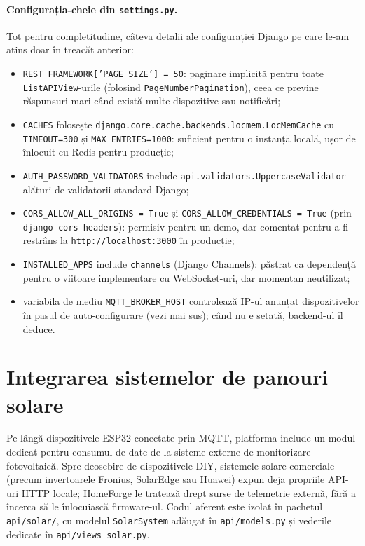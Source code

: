 \paragraph{Configurația-cheie din \texttt{settings.py}.} Tot pentru completitudine, câteva detalii ale configurației Django pe care le-am atins doar în treacăt anterior:
\begin{itemize}
    \item \texttt{REST\_FRAMEWORK['PAGE\_SIZE'] = 50}: paginare implicită pentru toate \texttt{ListAPIView}-urile (folosind \texttt{PageNumberPagination}), ceea ce previne răspunsuri mari când există multe dispozitive sau notificări;
    \item \texttt{CACHES} folosește \texttt{django.core.cache.backends.locmem.LocMemCache} cu \texttt{TIMEOUT=300} și \texttt{MAX\_ENTRIES=1000}: suficient pentru o instanță locală, ușor de înlocuit cu Redis pentru producție;
    \item \texttt{AUTH\_PASSWORD\_VALIDATORS} include \texttt{api.validators.UppercaseValidator} alături de validatorii standard Django;
    \item \texttt{CORS\_ALLOW\_ALL\_ORIGINS = True} și \texttt{CORS\_ALLOW\_CREDENTIALS = True} (prin \texttt{django-cors-headers}): permisiv pentru un demo, dar comentat pentru a fi restrâns la \texttt{http://localhost:3000} în producție;
    \item \texttt{INSTALLED\_APPS} include \texttt{channels} (Django Channels): păstrat ca dependență pentru o viitoare implementare cu WebSocket-uri, dar momentan neutilizat;
    \item variabila de mediu \texttt{MQTT\_BROKER\_HOST} controlează IP-ul anunțat dispozitivelor în pasul de auto-configurare (vezi mai sus); când nu e setată, backend-ul îl deduce.
\end{itemize}

\section{Integrarea sistemelor de panouri solare}
Pe lângă dispozitivele ESP32 conectate prin MQTT, platforma include un modul dedicat pentru consumul de date de la sisteme externe de monitorizare fotovoltaică. Spre deosebire de dispozitivele DIY, sistemele solare comerciale (precum invertoarele Fronius, SolarEdge sau Huawei) expun deja propriile API-uri HTTP locale; HomeForge le tratează drept surse de telemetrie externă, fără a încerca să le înlocuiască firmware-ul. Codul aferent este izolat în pachetul \texttt{api/solar/}, cu modelul \texttt{SolarSystem} adăugat în \texttt{api/models.py} și vederile dedicate în \texttt{api/views\_solar.py}.

